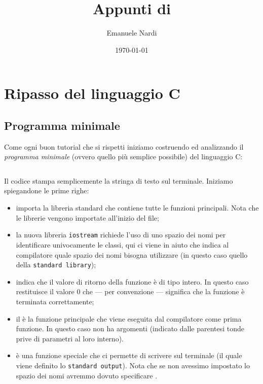 \documentclass[class=article, crop=false, 12pt]{standalone}
\title{Appunti di \Cpp{}}
\author{Emanuele Nardi}
\date{\today}
\begin{document}
\maketitle

\thispagestyle{empty}
\tableofcontents
\clearpage

\section{Ripasso del linguaggio C}

\subsection{Programma minimale}

Come ogni buon tutorial che si rispetti iniziamo costruendo ed analizzando il \emph{programma minimale} (ovvero quello più semplice possibile) del linguaggio C:

\inputminted{cpp}{assets/codes/cpp/ESEMPI_BASE/hello-world.cc}

Il codice stampa semplicemente la stringa  di testo  sul terminale.
Iniziamo spiegandone le prime righe:
\begin{itemize}
	\item {} importa la libreria standard che contiene tutte le funzioni principali. Nota che le librerie vengono importate all'inizio del file;
	\item la nuova libreria \texttt{iostream} richiede l'uso di uno spazio dei nomi per identificare univocamente le classi, qui ci viene in aiuto  che indica al compilatore quale spazio dei nomi bisogna utilizzare (in questo caso quello della \texttt{standard library});
	\item {} indica che il valore di ritorno della funzione è di tipo intero. In questo caso restituisce il valore \textsf{0} che --- per convenzione --- significa che la funzione è terminata correttamente;
	\item il  è la funzione principale che viene eseguita dal compilatore come prima funzione. In questo caso non ha argomenti (indicato dalle parentesi tonde prive di parametri al loro interno).
	\item {} è una funzione speciale che ci permette di scrivere sul terminale (il quale viene definito lo \texttt{standard output}). Nota che se non avessimo impostato lo spazio dei nomi avremmo dovuto specificare .
\end{itemize}
\end{document}
